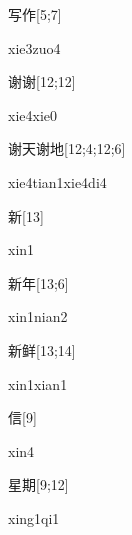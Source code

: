 \begin{verbete}{写作}[5;7]
\begin{pronuncia}{xie3zuo4}
\end{pronuncia}
\end{verbete}

\begin{verbete}{谢谢}[12;12]
\begin{pronuncia}{xie4xie0}
\end{pronuncia}
\end{verbete}

\begin{verbete}{谢天谢地}[12;4;12;6]
\begin{pronuncia}[\\]{xie4tian1xie4di4}
\end{pronuncia}
\end{verbete}

\begin{verbete}[xin1]{新}[13]
\begin{pronuncia}{xin1}
\end{pronuncia}
\end{verbete}

\begin{verbete}{新年}[13;6]
\begin{pronuncia}{xin1nian2}
\end{pronuncia}
\end{verbete}

\begin{verbete}{新鲜}[13;14]
\begin{pronuncia}{xin1xian1}
\end{pronuncia}
\end{verbete}

\begin{verbete}[xin4]{信}[9]
\begin{pronuncia}{xin4}
\end{pronuncia}
\end{verbete}

\begin{verbete}[xing1qi1]{星期}[9;12]
\begin{pronuncia}{xing1qi1}
\end{pronuncia}
\end{verbete}

